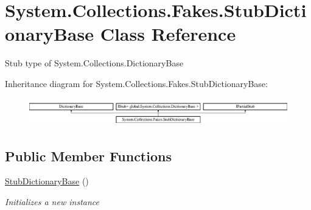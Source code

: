 \hypertarget{class_system_1_1_collections_1_1_fakes_1_1_stub_dictionary_base}{\section{System.\-Collections.\-Fakes.\-Stub\-Dictionary\-Base Class Reference}
\label{class_system_1_1_collections_1_1_fakes_1_1_stub_dictionary_base}
}


Stub type of System.\-Collections.\-Dictionary\-Base 


Inheritance diagram for System.\-Collections.\-Fakes.\-Stub\-Dictionary\-Base\-:\begin{figure}[H]
\begin{center}
\leavevmode
\includegraphics[height=1.220044cm]{class_system_1_1_collections_1_1_fakes_1_1_stub_dictionary_base}
\end{center}
\end{figure}
\subsection*{Public Member Functions}
\begin{DoxyCompactItemize}
\item 
\hyperlink{class_system_1_1_collections_1_1_fakes_1_1_stub_dictionary_base_a9d264f2e3d579b70ef6473f6aa283ef2}{Stub\-Dictionary\-Base} ()
\begin{DoxyCompactList}\small\item\em Initializes a new instance\end{DoxyCompactList}\end{DoxyCompactItemize}
